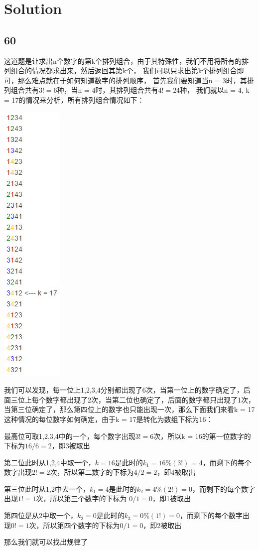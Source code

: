\documentclass[12pt,a4paper]{article}
\begin{document}
\section{Solution}
\subsection{60}
\begin{CJK}{UTF8}{gbsn}
这道题是让求出n个数字的第k个排列组合，由于其特殊性，我们不用将所有的排列组合的情况都求出来，然后返回其第k个，
我们可以只求出第k个排列组合即可，那么难点就在于如何知道数字的排列顺序，
首先我们要知道当n = 3时，其排列组合共有$3! = 6$种，当n = 4时，其排列组合共有$4! = 24$种，
我们就以n = 4, k = 17的情况来分析，所有排列组合情况如下：
\end{CJK}
\begin{center}
\includegraphics{0060.png}
\end{center}
\begin{CJK}{UTF8}{gbsn}
我们可以发现，每一位上1,2,3,4分别都出现了6次，当第一位上的数字确定了，后面三位上每个数字都出现了2次，当第二位也确定了，后面的数字都只出现了1次，当第三位确定了，那么第四位上的数字也只能出现一次，那么下面我们来看k = 17这种情况的每位数字如何确定，由于k = 17是转化为数组下标为16：
\par
最高位可取1,2,3,4中的一个，每个数字出现$3!= 6$次，所以k = 16的第一位数字的下标为$16 / 6 = 2$，即3被取出
\par
第二位此时从1,2,4中取一个，$k = 16$是此时的$k_1 = 16 \% (3!)$ = 4，而剩下的每个数字出现$2!= 2$次，所以第二数字的下标为$4 / 2 = 2$，即4被取出
\par
第三位此时从1,2中去一个，$k_1 = 4$是此时的$k_2 = 4 \% (2!) = 0$，而剩下的每个数字出现$1!= 1$次，所以第三个数字的下标为 $0 / 1 = 0$，即1被取出
\par
第四位是从2中取一个，$k_2 = 0$是此时的$k_3 = 0 \% (1!) = 0$，而剩下的每个数字出现$0!= 1$次，所以第四个数字的下标为$0 / 1= 0$，即2被取出
\par
那么我们就可以找出规律了
\end{CJK}
\end{document}
